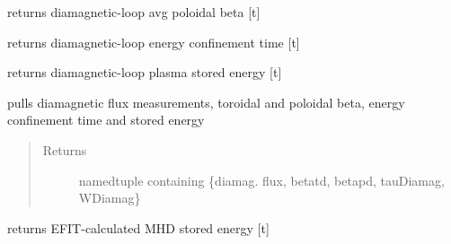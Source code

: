 \documentclass[letterpaper,10pt,english]{sphinxmanual}
\begin{document}
\begin{fulllineitems}
\begin{fulllineitems}
\end{fulllineitems}


\begin{fulllineitems}
\label{eqtools:eqtools.EFIT.EFITTree.getDiamagBetaP}
returns diamagnetic-loop avg poloidal beta {[}t{]}

\end{fulllineitems}


\begin{fulllineitems}
\label{eqtools:eqtools.EFIT.EFITTree.getDiamagTauE}
returns diamagnetic-loop energy confinement time {[}t{]}

\end{fulllineitems}


\begin{fulllineitems}
\label{eqtools:eqtools.EFIT.EFITTree.getDiamagWp}
returns diamagnetic-loop plasma stored energy {[}t{]}

\end{fulllineitems}


\begin{fulllineitems}
\label{eqtools:eqtools.EFIT.EFITTree.getDiamag}
pulls diamagnetic flux measurements, toroidal and poloidal beta, energy confinement time and stored energy
\begin{quote}\begin{description}
\item[{Returns}] \leavevmode
namedtuple containing \{diamag. flux, betatd, betapd, tauDiamag, WDiamag\}

\end{description}\end{quote}

\end{fulllineitems}


\begin{fulllineitems}
\label{eqtools:eqtools.EFIT.EFITTree.getWMHD}
returns EFIT-calculated MHD stored energy {[}t{]}


\end{fulllineitems}
\end{fulllineitems}
\end{document}
